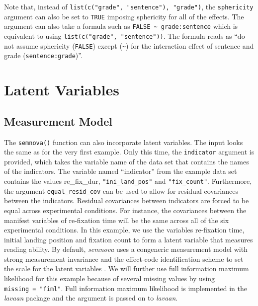 \documentclass[
]{book}
\begin{document}
Note that, instead of \texttt{list(c("grade",\ "sentence"),\ "grade")}, the \texttt{sphericity} argument can also be set to \texttt{TRUE} imposing sphericity for all of the effects. The argument can also take a formula such as \texttt{FALSE\ \textasciitilde{}\ grade:sentence} which is equivalent to using \texttt{list(c("grade",\ "sentence"))}. The formula reads as ``do not assume sphericity (\texttt{FALSE}) except (\texttt{\textasciitilde{}}) for the interaction effect of sentence and grade (\texttt{sentence:grade})''.

\hypertarget{latent-variables}{%
\section{Latent Variables}\label{latent-variables}}

\hypertarget{measurement-model}{%
\subsection{Measurement Model}\label{measurement-model}}

The \texttt{semnova()} function can also incorporate latent variables. The input looks the same as for the very first example. Only this time, the \texttt{indicator} argument is provided, which takes the variable name of the data set that contains the names of the indicators. The variable named ``indicator'' from the example data set contains the values re\_fix\_dur, \texttt{"ini\_land\_pos"} and \texttt{"fix\_count"}. Furthermore, the argument \texttt{equal\_resid\_cov} can be used to allow for residual covariances between the indicators. Residual covariances between indicators are forced to be equal across experimental conditions. For instance, the covariances between the manifest variables of re-fixation time will be the same across all of the six experimental conditions. In this example, we use the variables re-fixation time, initial landing position and fixation count to form a latent variable that measures reading ability. By default, \emph{semnova} uses a congeneric measurement model with strong measurement invariance and the effect-code identification scheme \citep{Little2006a} to set the scale for the latent variables \citep[see also][Section 2.4.1 ``Defining the Model'']{Langenberg2022z}. We will further use full information maximum likelihood for this example because of several missing values by using \texttt{missing\ =\ "fiml"}. Full information maximum likelihood is implemented in the \emph{lavaan} package and the argument is passed on to \emph{lavaan}.
\end{document}
